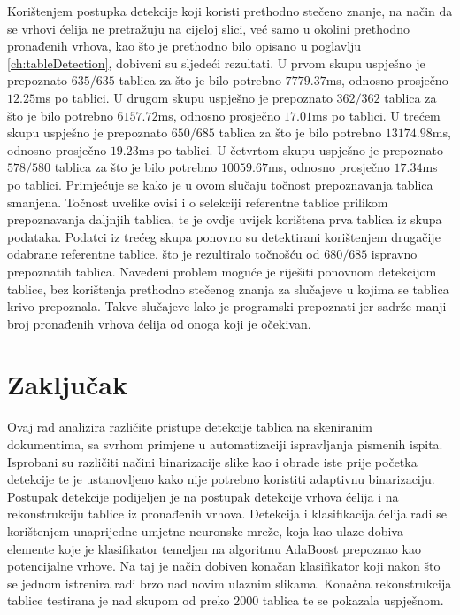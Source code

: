 \documentclass[times, utf8, zavrsni, numeric]{fer}
\begin{document}
Korištenjem postupka detekcije koji koristi prethodno stečeno znanje, na način da se vrhovi ćelija ne pretražuju na cijeloj slici, već samo u okolini prethodno pronađenih vrhova, kao što je prethodno bilo opisano u poglavlju \ref{ch:tableDetection}, dobiveni su sljedeći rezultati.
U prvom skupu uspješno je prepoznato $635/635$ tablica za što je bilo potrebno $7779.37$ms, odnosno prosječno $12.25$ms po tablici.
U drugom skupu uspješno je prepoznato $362/362$ tablica za što je bilo potrebno $6157.72$ms, odnosno prosječno $17.01$ms po tablici.
U trećem skupu uspješno je prepoznato $650/685$ tablica za što je bilo potrebno $13174.98$ms, odnosno prosječno $19.23$ms po tablici.
U četvrtom skupu uspješno je prepoznato $578/580$ tablica za što je bilo potrebno $10059.67$ms, odnosno prosječno $17.34$ms po tablici.
Primjećuje se kako je u ovom slučaju točnost prepoznavanja tablica smanjena.
Točnost uvelike ovisi i o selekciji referentne tablice prilikom prepoznavanja daljnjih tablica, te je ovdje uvijek korištena prva tablica iz skupa podataka.
Podatci iz trećeg skupa ponovno su detektirani korištenjem drugačije odabrane referentne tablice, što je rezultiralo točnošću od $680/685$ ispravno prepoznatih tablica.
Navedeni problem moguće je riješiti ponovnom detekcijom tablice, bez korištenja prethodno stečenog znanja za slučajeve u kojima se tablica krivo prepoznala.
Takve slučajeve lako je programski prepoznati jer sadrže manji broj pronađenih vrhova ćelija od onoga koji je očekivan.\\


\chapter{Zaključak}
\label{ch:conclusion}
Ovaj rad analizira različite pristupe detekcije tablica na skeniranim dokumentima, sa svrhom primjene u automatizaciji ispravljanja pismenih ispita.
Isprobani su različiti načini binarizacije slike kao i obrade iste prije početka detekcije te je ustanovljeno kako nije potrebno koristiti adaptivnu binarizaciju.
Postupak detekcije podijeljen je na postupak detekcije vrhova ćelija i na rekonstrukciju tablice iz pronađenih vrhova.
Detekcija i klasifikacija ćelija radi se korištenjem unaprijedne umjetne neuronske mreže, koja kao ulaze dobiva elemente koje je klasifikator temeljen na algoritmu AdaBoost prepoznao kao potencijalne vrhove.
Na taj je način dobiven konačan klasifikator koji nakon što se jednom istrenira radi brzo nad novim ulaznim slikama.
Konačna rekonstrukcija tablice testirana je nad skupom od preko $2000$ tablica te se pokazala uspješnom.
\end{document}
